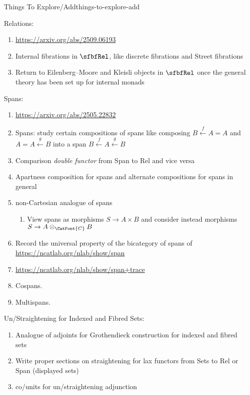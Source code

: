 \begin{remark}{Things To Explore/Add}{things-to-explore-add}
\begin{enumerate}
    \end{enumerate}
    Relations:
    \begin{enumerate}
        \item \url{https://arxiv.org/abs/2509.06193}
        \item Internal fibrations in $\sfbfRel$, like discrete fibrations and Street fibrations
        \item Return to Eilenberg--Moore and Kleisli objects in $\sfbfRel$ once the general theory has been set up for internal monads
    \end{enumerate}
    Spans:
    \begin{enumerate}
        \item \url{https://arxiv.org/abs/2505.22832}
        \item Spans: study certain compositions of spans like composing $B\xleftarrow{f}A=A$ and $A=A\xleftarrow{g}B$ into a span $B\xleftarrow{f}A\xleftarrow{g}B$
        \item Comparison \emph{double functor} from Span to Rel and vice versa
        \item Apartness composition for spans and alternate compositions for spans in general
        \item non-Cartesian analogue of spans
            \begin{enumerate}
                \item View spans as morphisms $S\to A\times B$ and consider instead morphisms $S\to A\otimes_{\CatFont{C}}B$
            \end{enumerate}
        \item Record the universal property of the bicategory of spans of \url{https://ncatlab.org/nlab/show/span}
        \item \url{https://ncatlab.org/nlab/show/span+trace}
        \item Cospans.
        \item Multispans.
    \end{enumerate}
    Un/Straightening for Indexed and Fibred Sets:
    \begin{enumerate}
        \item Analogue of adjoints for Grothendieck construction for indexed and fibred sets
        \item Write proper sections on straightening for lax functors from Sets to Rel or Span (displayed sets)
        \item co/units for un/straightening adjunction
    \end{enumerate}

\end{remark}
